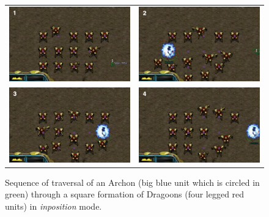 \begin{figure}[h]
\begin{center}
\begin{tabular}{cc}
\includegraphics[width=0.47\columnwidth]{images/square_traversal_1.png} & 
\includegraphics[width=0.47\columnwidth]{images/square_traversal_2.png} \\
\includegraphics[width=0.47\columnwidth]{images/square_traversal_3.png} & 
\includegraphics[width=0.47\columnwidth]{images/square_traversal_4.png} \\
\end{tabular}
\caption{Sequence of traversal of an Archon (big blue unit which is circled in green) through a square formation of Dragoons (four legged red units) in \textit{inposition} mode.}
\label{fig:squaretraversal}
\end{center}
\end{figure}


